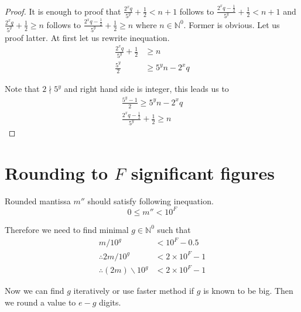 \documentclass[english]{article}
\newcommand{\idiv}{\backslash}
\renewcommand{\leq}{\leqslant}
\renewcommand{\geq}{\geqslant}
\begin{document}
\begin{proof}
    It is enough to proof that $\frac{2^x q}{5^y} + \frac{1}{2} < n+1$
    follows to $\frac{2^x q - \frac{1}{2}}{5^y} + \frac{1}{2} < n+1$
    and $\frac{2^x q}{5^y} + \frac{1}{2} \geq n$
    follows to $\frac{2^x q - \frac{1}{2}}{5^y} + \frac{1}{2} \geq n$
    where $n \in \mathbb{N}^0$.
    Former is obvious. Let us proof latter. At first let us rewrite inequation.
    \begin{align*}
        \frac{2^x q}{5^y} + \frac{1}{2} & \geq n \\
        \frac{5^y}{2} & \geq 5^y n - 2^x q
    \end{align*}

    Note that $2 \nmid 5^{y}$ and right hand side is integer, this leads us to
    \begin{align*}
        \frac{5^y - 1}{2} \geq 5^y n - 2^x q \\
        \frac{2^x q - \frac{1}{2}}{5^y} + \frac{1}{2} \geq n
    \end{align*}
\end{proof}

\section{Rounding to $F$ significant figures}

Rounded mantissa $m''$ should satisfy following inequation.
\[
    0 \leq m'' < 10^F
\]

Therefore we need to find minimal $g \in \mathbb{N}^0$ such that
\begin{align*}
    m / 10^g & < 10^F - 0.5 \\
    \therefore 2m / 10^g & < 2 \times 10^F - 1 \\
    \therefore (2m) \idiv 10^g & < 2 \times 10^F - 1
\end{align*}

Now we can find $g$ iteratively or use faster method if $g$ is known to be big.
Then we round a value to $e-g$ digits.
\end{document}

